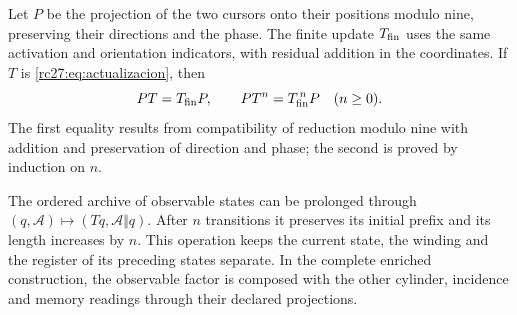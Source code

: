 Let $P$ be the projection of the two cursors onto their positions modulo
nine, preserving their directions and the phase. The finite
update $T_{\rm fin}$ uses the same activation and
orientation indicators, with residual addition in the coordinates. If $T$ is
\eqref{rc27:eq:actualizacion}, then
\[
PT=T_{\rm fin}P,\qquad PT^n=T_{\rm fin}^{\,n}P
\quad(n\ge0).
\]
The first equality results from compatibility of reduction
modulo nine with addition and preservation of direction and phase;
the second is proved by induction on $n$.

The ordered archive of observable states can be prolonged through
$(q,\mathcal A)\mapsto(Tq,\mathcal A\Vert q)$.
After $n$ transitions it preserves its initial prefix and its length
increases by $n$. This operation keeps the current state,
the winding and the register of its preceding states separate. In the
complete enriched construction, the observable factor is composed
with the other cylinder, incidence and memory readings through their
declared projections.
